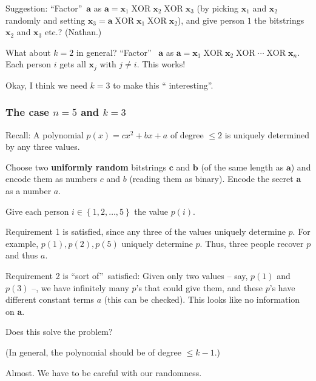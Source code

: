 \documentclass[numbers=enddot,12pt,final,onecolumn,notitlepage]{scrartcl}%
\numberwithin{exer}{section}
\theoremstyle{definition}
\begin{document}
Suggestion: \textquotedblleft Factor\textquotedblright\ $\mathbf{a}$ as
$\mathbf{a}=\mathbf{x}_{1}\operatorname*{XOR}\mathbf{x}_{2}\operatorname*{XOR}%
\mathbf{x}_{3}$ (by picking $\mathbf{x}_{1}$ and $\mathbf{x}_{2}$ randomly and
setting $\mathbf{x}_{3}=\mathbf{a}\operatorname*{XOR}\mathbf{x}_{1}%
\operatorname*{XOR}\mathbf{x}_{2}$), and give person $1$ the bitstrings
$\mathbf{x}_{2}$ and $\mathbf{x}_{3}$ etc.? (Nathan.)

What about $k=2$ in general? \textquotedblleft Factor\textquotedblright%
\ $\mathbf{a}$ as $\mathbf{a}=\mathbf{x}_{1}\operatorname*{XOR}\mathbf{x}%
_{2}\operatorname*{XOR}\cdots\operatorname*{XOR}\mathbf{x}_{n}$. Each person
$i$ gets all $\mathbf{x}_{j}$ with $j\neq i$. This works!

Okay, I think we need $k=3$ to make this \textquotedblleft
interesting\textquotedblright.

\subsubsection{The case $n=5$ and $k=3$}

Recall: A polynomial $p\left(  x\right)  =cx^{2}+bx+a$ of degree $\leq2$ is
uniquely determined by any three values.

Choose two \textbf{uniformly random} bitstrings $\mathbf{c}$ and $\mathbf{b}$
(of the same length as $\mathbf{a}$) and encode them as numbers $c$ and $b$
(reading them as binary). Encode the secret $\mathbf{a}$ as a number $a$.

Give each person $i\in\left\{  1,2,\ldots,5\right\}  $ the value $p\left(
i\right)  $.

Requirement 1 is satisfied, since any three of the values uniquely determine
$p$. For example, $p\left(  1\right)  ,p\left(  2\right)  ,p\left(  5\right)
$ uniquely determine $p$. Thus, three people recover $p$ and thus $a$.

Requirement 2 is \textquotedblleft sort of\textquotedblright\ satisfied: Given
only two values -- say, $p\left(  1\right)  $ and $p\left(  3\right)  $ --, we
have infinitely many $p$'s that could give them, and these $p$'s have
different constant terms $a$ (this can be checked). This looks like no
information on $\mathbf{a}$.

Does this solve the problem?

(In general, the polynomial should be of degree $\leq k-1$.)

Almost. We have to be careful with our randomness.
\end{document}
